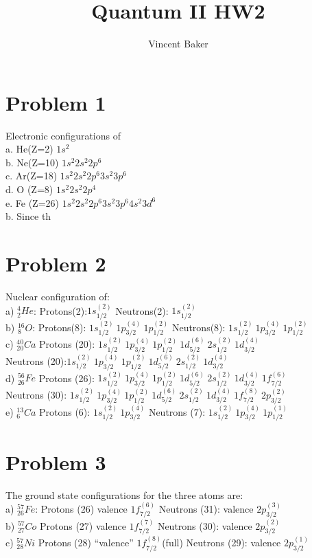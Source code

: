 \documentclass[a4paper,12pt]{article}
\title{Quantum II HW2}
\author{Vincent Baker}
\numberwithin{equation}{section}
\begin{document}
\maketitle

\section{Problem 1}

Electronic configurations of \\
a. He(Z=2) $1s^2$ \\
b. Ne(Z=10) $1s^2 2s^2 2p^6$\\
c. Ar(Z=18) $1s^2 2s^2 2p^6 3s^2 3p^6$ \\
d. O (Z=8) $1s^2 2s^2 2p^4$ \\
e. Fe (Z=26) $1s^2 2s^2 2p^6 3s^2 3p^6 4s^2 3d^6 $\\
b. Since th
\section{Problem 2}
Nuclear configuration of:\\
a) $^4_2He$: Protons(2):$1s_{1/2}^{(2)}$  Neutrons(2): $1s_{1/2}^{(2)}$ \\
b) $^{16}_8O$: Protons(8): $1s_{1/2}^{(2)}\ 1p_{3/2}^{(4)}\ 1p_{1/2}^{(2)}$  Neutrons(8): $1s_{1/2}^{(2)}\ 1p_{3/2}^{(4)}\ 1p_{1/2}^{(2)}$ \\
c) $^{40}_{20}Ca$ Protons (20): $1s_{1/2}^{(2)}\ 1p_{3/2}^{(4)}\ 1p_{1/2}^{(2)}\ 1d_{5/2}^{(6)}\ 2s_{1/2}^{(2)}\ 1d_{3/2}^{(4)} $  
\\ Neutrons (20):$1s_{1/2}^{(2)}\ 1p_{3/2}^{(4)}\ 1p_{1/2}^{(2)}\ 1d_{5/2}^{(6)}\ 2s_{1/2}^{(2)}\ 1d_{3/2}^{(4)} $ \\
d) $^{56}_{26}Fe$ Protons (26): $1s_{1/2}^{(2)}\ 1p_{3/2}^{(4)}\ 1p_{1/2}^{(2)}\ 1d_{5/2}^{(6)}\ 2s_{1/2}^{(2)}\ 1d_{3/2}^{(4)}\ 1f_{7/2}^{(6)} $  
   \\ Neutrons (30): $1s_{1/2}^{(2)}\ 1p_{3/2}^{(4)}\ 1p_{1/2}^{(2)}\ 1d_{5/2}^{(6)}\ 2s_{1/2}^{(2)}\ 1d_{3/2}^{(4)}\ 1f_{7/2}^{(8)}\ 2p_{3/2}^{(2)} $\\
e) $^{13}_6Ca $ Protons (6): $1s_{1/2}^{(2)}\ 1p_{3/2}^{(4)} $ Neutrons (7): $1s_{1/2}^{(2)}\ 1p_{3/2}^{(4)}\ 1p_{1/2}^{(1)} $

\section{Problem 3}
The ground state configurations for the three atoms are:\\
a) $^{57}_{26}Fe$: Protons (26) valence $1f_{7/2}^{(6)}$ Neutrons (31): valence $2p_{3/2}^{(3)}$ \\
b) $^{57}_{27}Co$  Protons (27) valence $1f_{7/2}^{(7)}$ Neutrons (30): valence $2p_{3/2}^{(2)}$\\
c) $^{57}_{28}Ni$  Protons (28) ``valence'' $1f_{7/2}^{(8)}$(full) Neutrons (29): valence $2p_{3/2}^{(1)}$
\end{document}
